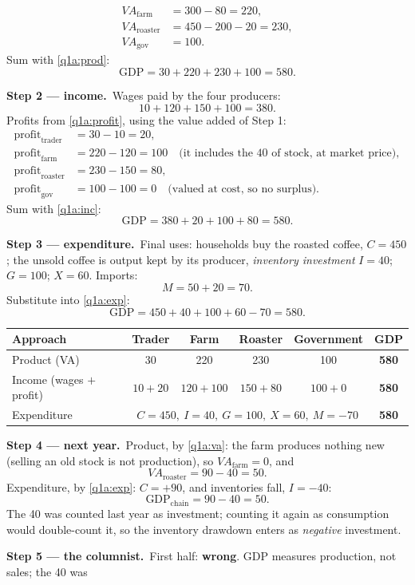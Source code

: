 \documentclass[11pt,a4paper]{article}
\newcommand{\passo}[2]{\par\smallskip\noindent\textbf{Step #1.}~#2}
\begin{document}
\begin{sol}
{\begin{align*}
VA_{\text{farm}} &= 300-80=220,\\
VA_{\text{roaster}} &= 450-200-20=230,\\
VA_{\text{gov}} &= 100.
\end{align*}
Sum with \eqref{q1a:prod}:
\[
\text{GDP}=30+220+230+100=\boxed{580}.
\]}
\passo{2 --- income}{Wages paid by the four producers:
\[
10+120+150+100=380.
\]
Profits from \eqref{q1a:profit}, using the value added of Step 1:
\begin{align*}
\text{profit}_{\text{trader}} &= 30-10=20,\\
\text{profit}_{\text{farm}} &= 220-120=100\quad\text{(it includes the 40 of stock, at market price)},\\
\text{profit}_{\text{roaster}} &= 230-150=80,\\
\text{profit}_{\text{gov}} &= 100-100=0\quad\text{(valued at cost, so no surplus)}.
\end{align*}
Sum with \eqref{q1a:inc}:
\[
\text{GDP}=380+20+100+80=\boxed{580}.
\]}
\passo{3 --- expenditure}{Final uses: households buy the roasted coffee, $C=450$; the unsold coffee is output
kept by its producer, \emph{inventory investment} $I=40$; $G=100$; $X=60$. Imports:
\[
M=50+20=70.
\]
Substitute into \eqref{q1a:exp}:
\[
\text{GDP}=450+40+100+60-70=\boxed{580}.
\]}
\begin{center}\small
\begin{tabular}{@{}lccccc@{}}
\toprule
Approach & Trader & Farm & Roaster & Government & GDP\\
\midrule
Product (VA) & 30 & 220 & 230 & 100 & \textbf{580}\\
Income (wages $+$ profit) & $10+20$ & $120+100$ & $150+80$ & $100+0$ & \textbf{580}\\
Expenditure & \multicolumn{4}{c}{$C=450,\ I=40,\ G=100,\ X=60,\ M=-70$} & \textbf{580}\\
\bottomrule
\end{tabular}
\end{center}
\passo{4 --- next year}{Product, by \eqref{q1a:va}: the farm produces nothing new (selling an old stock is not
production), so $VA_{\text{farm}}=0$, and
\[
VA_{\text{roaster}}=90-40=\boxed{50}.
\]
Expenditure, by \eqref{q1a:exp}: $C=+90$, and inventories fall, $I=-40$:
\[
\text{GDP}_{\text{chain}}=90-40=\boxed{50}.
\]
The 40 was counted last year as investment; counting it again as consumption would double-count it, so the
inventory drawdown enters as \emph{negative} investment.}
\passo{5 --- the columnist}{First half: \textbf{wrong}. GDP measures production, not sales; the 40 was
}
\end{sol}
\end{document}
